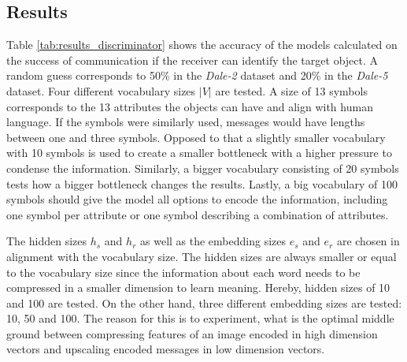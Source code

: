 \subsection*{Results}
Table \ref{tab:results_discriminator} shows the accuracy of the models calculated on the success of communication if the receiver can identify the target object.
A random guess corresponds to 50\% in the \emph{Dale-2} dataset and 20\% in the \emph{Dale-5} dataset.
Four different vocabulary sizes $|V|$ are tested.
A size of 13 symbols corresponds to the 13 attributes the objects can have and align with human language.
If the symbols were similarly used, messages would have lengths between one and three symbols.
Opposed to that a slightly smaller vocabulary with 10 symbols is used to create a smaller bottleneck with a higher pressure to condense the information.
Similarly, a bigger vocabulary consisting of 20 symbols tests how a bigger bottleneck changes the results.
Lastly, a big vocabulary of 100 symbols should give the model all options to encode the information, including one symbol per attribute or one symbol describing a combination of attributes.

The hidden sizes $h_s$ and $h_r$ as well as the embedding sizes $e_s$ and $e_r$ are chosen in alignment with the vocabulary size.
The hidden sizes are always smaller or equal to the vocabulary size since the information about each word needs to be compressed in a smaller dimension to learn meaning.
Hereby, hidden sizes of 10 and 100 are tested.
On the other hand, three different embedding sizes are tested: 10, 50 and 100.
The reason for this is to experiment, what is the optimal middle ground between compressing features of an image encoded in high dimension vectors and upscaling encoded messages in low dimension vectors.

